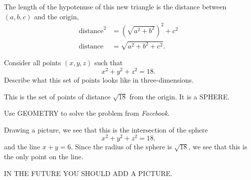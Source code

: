 \documentclass[noauthor,nooutcomes,handout]{ximera}
\begin{document}
\begin{question}
\begin{freeResponse}
\begin{enumerate}
\begin{center}
    \end{center}
    The length of the hypotenuse of this new triangle is the distance
    between $(a,b,c)$ and the origin,
    \begin{align*}
      \text{distance}^2&= \left(\sqrt{a^2+b^2}\right)^2 + c^2\\
       \text{distance}&=  \sqrt{a^2+b^2 + c^2}.
    \end{align*}
    \end{enumerate}
  \end{freeResponse}
\end{question}
\mynewpage


\begin{question}
  Consider all points $(x,y,z)$ such that
  \[
  x^2 + y^2 + z^2 = 18.
  \]
  Describe what this set of points looks like in three-dimensions.
  \begin{freeResponse}
    This is the set of points of distance $\sqrt{18}$ from the
    origin. It is a SPHERE.
  \end{freeResponse}
\end{question}
\mynewpage


\begin{question}
  Use GEOMETRY to solve the problem from \textsl{Facebook}.
  \begin{freeResponse}
    Drawing a picture, we see that this is the intersection of the sphere
      \[
      x^2 + y^2 + z^2 = 18.
      \]
      and the line $x+y=6$. Since the radius of the sphere is
      $\sqrt{18}$, we see that this is the only point on the line.

      IN THE FUTURE YOU SHOULD ADD A PICTURE.
  \end{freeResponse}
\end{question}
\end{document}
